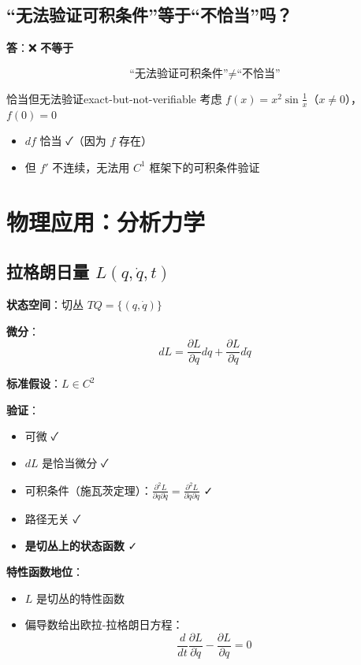 \documentclass[12pt,a4paper]{article}
\begin{document}
\subsection{``无法验证可积条件''等于``不恰当''吗？}

\textbf{答}：❌ \textbf{不等于}

\begin{equation}
\boxed{\text{``无法验证可积条件''} \neq \text{``不恰当''}}
\end{equation}

\begin{example}{恰当但无法验证}{exact-but-not-verifiable}
考虑 $f(x) = x^2\sin\frac{1}{x}$（$x \neq 0$），$f(0)=0$

\begin{itemize}
\item $df$ 恰当 ✓（因为 $f$ 存在）
\item 但 $f'$ 不连续，无法用 $C^1$ 框架下的可积条件验证
\end{itemize}
\end{example}

\section{物理应用：分析力学}

\subsection{拉格朗日量 $L(q, \dot{q}, t)$}

\textbf{状态空间}：切丛 $TQ = \{(q, \dot{q})\}$

\textbf{微分}：
\begin{equation}
dL = \frac{\partial L}{\partial q}dq + \frac{\partial L}{\partial \dot{q}}d\dot{q}
\end{equation}

\textbf{标准假设}：$L \in C^2$

\textbf{验证}：
\begin{itemize}
\item 可微 ✓
\item $dL$ 是恰当微分 ✓
\item 可积条件（施瓦茨定理）：$\frac{\partial^2 L}{\partial q \partial \dot{q}} = \frac{\partial^2 L}{\partial \dot{q} \partial q}$ ✓
\item 路径无关 ✓
\item \textbf{是切丛上的状态函数} ✓
\end{itemize}

\textbf{特性函数地位}：
\begin{itemize}
\item $L$ 是切丛的特性函数
\item 偏导数给出欧拉-拉格朗日方程：
\begin{equation}
\frac{d}{dt}\frac{\partial L}{\partial \dot{q}} - \frac{\partial L}{\partial q} = 0
\end{equation}
\end{itemize}
\end{document}
